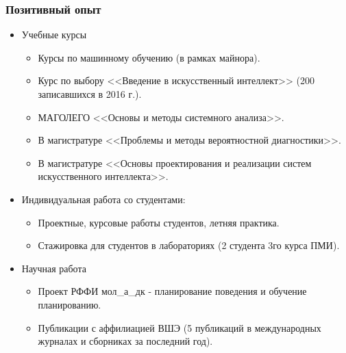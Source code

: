 \documentclass[default]{beamer}
\begin{document}
	\begin{frame}
		\frametitle{Позитивный опыт}
		
		\begin{itemize}
			\item Учебные курсы
			\begin{itemize}
				\item Курсы по машинному обучению (в рамках майнора).
				\item Курс по выбору <<Введение в искусственный интеллект>> (200 записавшихся в 2016 г.).
				\item МАГОЛЕГО <<Основы и методы системного анализа>>.
				\item В магистратуре <<Проблемы и методы вероятностной диагностики>>.
				\item В магистратуре <<Основы проектирования и реализации систем искусственного интеллекта>>.
			\end{itemize}
			\item Индивидуальная работа со студентами:
			\begin{itemize}
				\item Проектные, курсовые работы студентов, летняя практика.
				\item Стажировка для студентов в лабораториях (2 студента 3го курса ПМИ).
			\end{itemize}
			
			\item Научная работа
			\begin{itemize}
				\item Проект РФФИ мол\_а\_дк - планирование поведения и обучение планированию.
				\item Публикации с аффилиацией ВШЭ (5 публикаций в международных журналах и сборниках за последний год).
			\end{itemize}
		\end{itemize}
	\end{frame}	
	
\end{document}

